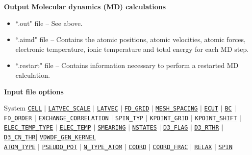 \documentclass[xcolor=dvipsnames,t]{beamer}
\begin{document}
\begin{frame}{\textbf{Output}}
\textbf{Molecular dynamics (MD) calculations}  \\
\begin{itemize}
  \item ``.out" file -- See above.
  \item ``.aimd" file -- Contains the atomic positions, atomic velocities, atomic forces, electronic temperature, ionic temperature and total energy for each MD step.
  \item ``.restart" file -- Contains information necessary to perform a restarted MD calculation. 
\end{itemize}

\end{frame}



\begin{frame}[allowframebreaks]{\textbf{Input file options}} \label{Index}
\vspace{-2mm}
\begin{block}{System}
\hyperlink{CELL}{\texttt{CELL}} $\vert$ \hyperlink{LATVEC_SCALE}{\texttt{LATVEC\_SCALE}} $\vert$ \hyperlink{LATVEC}{\texttt{LATVEC}}  $\vert$ \hyperlink{FD_GRID}{\texttt{FD\_GRID}} $\vert$ \hyperlink{MESH_SPACING}{\texttt{MESH\_SPACING}} $\vert$ \hyperlink{ECUT}{\texttt{ECUT}} $\vert$ \hyperlink{BC}{\texttt{BC}} $\vert$ \hyperlink{FD_ORDER}{\texttt{FD\_ORDER}} $\vert$ \hyperlink{EXCHANGE_CORRELATION}{\texttt{EXCHANGE\_CORRELATION}} $\vert$ \hyperlink{SPIN_TYP}{\texttt{SPIN\_TYP}} $\vert$ \hyperlink{KPOINT_GRID}{\texttt{KPOINT\_GRID}} $\vert$ \hyperlink{KPOINT_SHIFT}{\texttt{KPOINT\_SHIFT}} $\vert$ \hyperlink{ELEC_TEMP_TYPE}{\texttt{ELEC\_TEMP\_TYPE}} $\vert$ \hyperlink{ELEC_TEMP}{\texttt{ELEC\_TEMP}} $\vert$ \hyperlink{SMEARING}{\texttt{SMEARING}} $\vert$ \hyperlink{NSTATES}{\texttt{NSTATES}}    $\vert$ \hyperlink{D3_FLAG}{\texttt{D3\_FLAG}} $\vert$ \hyperlink{D3_RTHR}{\texttt{D3\_RTHR}} $\vert$ \hyperlink{D3_CN_THR}{\texttt{D3\_CN\_THR}}$\vert$ \hyperlink{VDWDF_GEN_KERNEL}{\texttt{VDWDF\_GEN\_KERNEL}}\\
\hyperlink{ATOM_TYPE}{\texttt{ATOM\_TYPE}} $\vert$ \hyperlink{PSEUDO_POT}{\texttt{PSEUDO\_POT}}  $\vert$ \hyperlink{N_TYPE_ATOM}{\texttt{N\_TYPE\_ATOM}} $\vert$ \hyperlink{COORD}{\texttt{COORD}} $\vert$ \hyperlink{COORD_FRAC}{\texttt{COORD\_FRAC}} $\vert$ \hyperlink{RELAX}{\texttt{RELAX}} $\vert$ \hyperlink{SPIN}{\texttt{SPIN}}
\end{block}


\end{frame}
\end{document}
